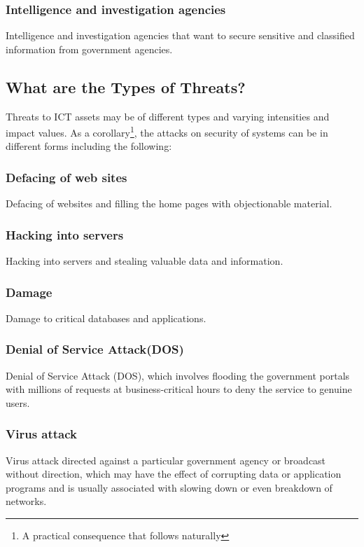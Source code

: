  \subsubsection*{Intelligence and investigation agencies}
 Intelligence and investigation agencies that want to secure sensitive and classified information from government agencies.
 
 
 \subsection{What are the Types of Threats?}
 Threats to ICT assets may be of different types and varying intensities and impact values. As a  corollary\footnote{A practical consequence that follows naturally}, the attacks on security of systems can be in different forms including the following:
 
 \subsubsection*{Defacing of web sites}
 Defacing of websites and filling the home pages with objectionable material.
 
 \subsubsection*{Hacking into servers}
 Hacking into servers and stealing valuable data and information.
 
 \subsubsection*{Damage}
 Damage to critical databases and applications.
 
 \subsubsection*{Denial of Service Attack(DOS)}
 Denial of Service Attack (DOS), which involves flooding the government portals with millions of requests at business-critical hours to deny the service to genuine users.
 
 \subsubsection*{Virus attack}
 Virus attack directed against a particular government agency or broadcast without direction, which may have the effect of corrupting data or application programs and is usually associated with slowing down or even breakdown of networks.
 
